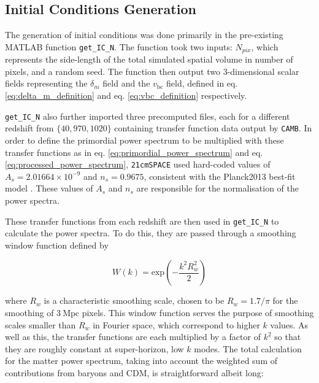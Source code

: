 \documentclass[floats,floatfix,showpacs,amssymb,prd,superscriptaddress,nofootinbib]{revtex4-2} %
\newcommand{\code}{\texttt}
\newcommand{\red}{\textcolor{red}}
\begin{document}



\subsection{Initial Conditions Generation}

The generation of initial conditions was done primarily in the pre-existing MATLAB function \code{get\_IC\_N}. The function took two inputs: $N_{pix}$, which represents the side-length of the total simulated spatial volume in number of pixels, and a random seed. The function then output two 3-dimensional scalar fields representing the $\delta_m$ field and the $v_{\text{bc}}$ field, defined in eq. \ref{eq:delta_m_definition} and eq. \ref{eq:vbc_definition} respectively.

\code{get\_IC\_N} also further imported three precomputed files, each for a different redshift from $\{40, 970, 1020\}$ containing transfer function data output by \code{CAMB}. In order to define the primordial power spectrum to be multiplied with these transfer functions as in eq. \ref{eq:primordial_power_spectrum} and eq. \ref{eq:processed_power_spectrum}, \code{21cmSPACE} used hard-coded values of $A_s = 2.01664 \times 10^{-9}$ and $n_s = 0.9675$, consistent with the Planck2013 best-fit model \citep{Planck2013results}. These values of $A_s$ and $n_s$ are responsible for the normalisation of the power spectra.

These transfer functions from each redshift are then used in \code{get\_IC\_N} to calculate the power spectra. To do this, they are  passed through a smoothing window function defined by 

\begin{equation}
    W(k) = \text{exp}\left( -\frac{k^2 R_w ^2}{2} \right)
\end{equation}

\noindent where $R_w$ is a characteristic smoothing scale, chosen to be $R_w = 1.7 / \pi$ for the smoothing of $3 ~\text{Mpc}$ pixels. 
This window function serves the purpose of smoothing scales smaller than $R_w$ in Fourier space, which correspond to higher $k$ values. As well as this, the transfer functions are each multiplied by a factor of $k^2$ so that they are roughly constant at super-horizon, low $k$ modes. The total calculation for the matter power spectrum, taking into account the weighted sum of contributions from baryons and CDM, is straightforward albeit long:
\end{document}
